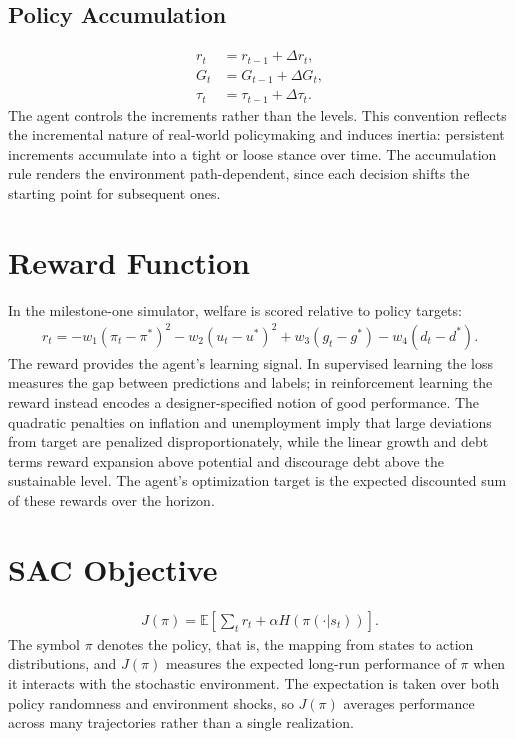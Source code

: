 \documentclass[11pt]{article}
\begin{document}
\subsection{Policy Accumulation}
\begin{align*}
    r_t &= r_{t-1} + \Delta r_t, \\
    G_t &= G_{t-1} + \Delta G_t, \\
    \tau_t &= \tau_{t-1} + \Delta \tau_t.
\end{align*}
The agent controls the increments rather than the levels. This convention reflects the incremental nature of real-world policymaking and induces inertia: persistent increments accumulate into a tight or loose stance over time. The accumulation rule renders the environment path-dependent, since each decision shifts the starting point for subsequent ones.

\section{Reward Function}
In the milestone-one simulator, welfare is scored relative to policy targets:
\begin{align}
    r_t = - w_1 (\pi_t - \pi^*)^2 - w_2 (u_t - u^*)^2 + w_3 (g_t - g^*) - w_4 (d_t - d^*).
\end{align}
The reward provides the agent's learning signal. In supervised learning the loss measures the gap between predictions and labels; in reinforcement learning the reward instead encodes a designer-specified notion of good performance. The quadratic penalties on inflation and unemployment imply that large deviations from target are penalized disproportionately, while the linear growth and debt terms reward expansion above potential and discourage debt above the sustainable level. The agent's optimization target is the expected discounted sum of these rewards over the horizon.

\section{SAC Objective}
\begin{align}
    J(\pi) = \mathbb{E}\left[\sum_t r_t + \alpha H(\pi(\cdot|s_t))\right].
\end{align}
The symbol $\pi$ denotes the policy, that is, the mapping from states to action distributions, and $J(\pi)$ measures the expected long-run performance of $\pi$ when it interacts with the stochastic environment. The expectation is taken over both policy randomness and environment shocks, so $J(\pi)$ averages performance across many trajectories rather than a single realization.
\end{document}
